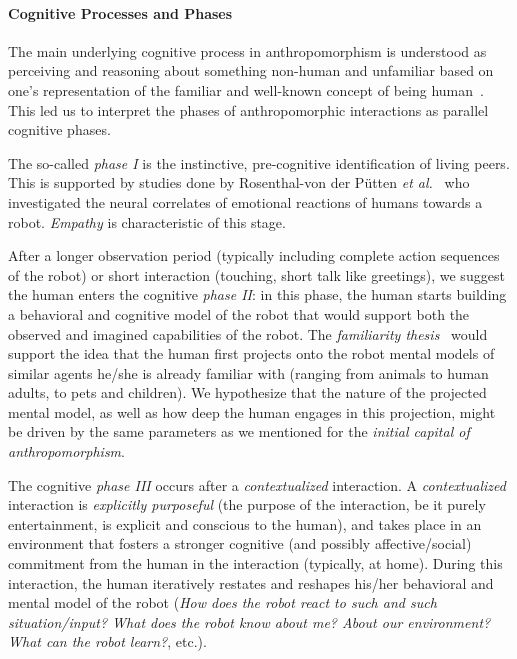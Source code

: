 \documentclass{sig-alternate-2013}
\begin{document}
\paragraph*{Cognitive Processes and Phases}

The main underlying cognitive process in anthropomorphism is understood as
perceiving and reasoning about something non-human and unfamiliar based on
one's representation of the familiar and well-known concept of being
human~\cite{epley_when_2008}. This led us to interpret the phases of
anthropomorphic interactions as parallel cognitive phases.

The so-called \emph{phase I} is the instinctive, pre-cognitive identification of
living peers. This is supported by studies done by Rosenthal-von der Pütten
\textit{et al.}~\cite{rosenthal-vonderputten_experimental_2013} who investigated
the neural correlates of emotional reactions of humans towards a robot. {\it
Empathy} is characteristic of this stage.

After a longer observation period (typically including complete action sequences
of the robot) or short interaction (touching, short talk like greetings), we
suggest the human enters the cognitive \emph{phase II}: in this phase, the human
starts building a behavioral and cognitive model of the robot that would support
both the observed and imagined capabilities of the robot.  The \emph{familiarity
thesis}~\cite{hegel_understanding_2008} would support the idea that the human
first projects onto the robot mental models of similar agents he/she is already
familiar with (ranging from animals to human adults, to pets and children). We 
hypothesize that the nature of the projected mental
model, as well as how deep the human engages in this projection, might be
driven by the same parameters as we mentioned for the \emph{initial capital of
anthropomorphism}.

The cognitive \emph{phase III} occurs after a \emph{contextualized} interaction.
A \emph{contextualized} interaction is \emph{explicitly purposeful} (the purpose
of the interaction, be it purely entertainment, is explicit and conscious to the
human), and takes place in an environment that fosters a stronger cognitive (and
possibly affective/social) commitment from the human in the interaction
(typically, at home). During this interaction, the human iteratively restates
and reshapes his/her behavioral and mental model of the robot (\emph{How does
the robot react to such and such situation/input?  What does the robot know
about me? About our environment? What can the robot learn?}, etc.).
\end{document}
